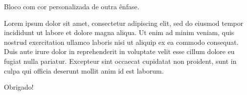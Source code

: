 \documentclass[aspectratio=169]{beamer}
\begin{document}
\begin{frame}[standout]
  \begin{standoutbox}[math300]
    Bloco com cor personalizada de outra ênfase.
  \end{standoutbox}
\end{frame}

\begin{frame}[standout]
  \begin{standoutbox}[comp300]
    Lorem ipsum dolor sit amet, consectetur adipiscing elit, sed do eiusmod tempor incididunt ut labore et dolore magna aliqua. Ut enim ad minim veniam, quis nostrud exercitation ullamco laboris nisi ut aliquip ex ea commodo consequat. Duis aute irure dolor in reprehenderit in voluptate velit esse cillum dolore eu fugiat nulla pariatur. Excepteur sint occaecat cupidatat non proident, sunt in culpa qui officia deserunt mollit anim id est laborum.
  \end{standoutbox}
\end{frame}

\begin{frame}[standout]
  \begin{standoutbox}
    Obrigado!
  \end{standoutbox}
\end{frame}
\end{document}
